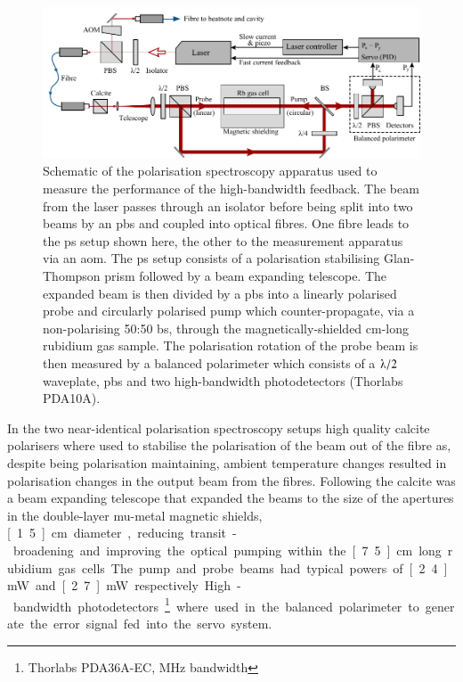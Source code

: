 \begin{figure}
\center
\includegraphics[width=\linewidth]{part1/Figs/ps_two_laser.pdf}
\caption[Apparatus used to test the efficacy of polarisation spectroscopy.]{Schematic of the polarisation spectroscopy apparatus used to measure the performance of the high-bandwidth feedback. The beam from the laser passes through an isolator before being split into two beams by an \gls{pbs} and coupled into optical fibres.
One fibre leads to the \gls{ps} setup shown here, the other to the measurement apparatus via an \gls{aom}.
The \gls{ps} setup consists of a polarisation stabilising Glan-Thompson prism followed by a beam expanding telescope.
The expanded beam is then divided by a \gls{pbs} into a linearly polarised probe and circularly polarised pump which counter-propagate, via a non-polarising 50:50 \gls{bs}, through the magnetically-shielded \unit[15]{cm}-long rubidium gas sample.
The polarisation rotation of the probe beam is then measured by a balanced polarimeter which consists of a $\lambdaup/2$ waveplate, \gls{pbs} and two high-bandwidth photodetectors (Thorlabs PDA10A).}
\label{figure:two_laser_setup}
\end{figure}

In the two near-identical polarisation spectroscopy setups high quality calcite polarisers where used to stabilise the polarisation of the beam out of the fibre as, despite being polarisation maintaining, ambient temperature changes resulted in polarisation changes in the output beam from the fibres.
Following the calcite was a beam expanding telescope that expanded the beams to the size of the apertures in the double-layer mu-metal magnetic shields, \unit[1.5]{cm} diameter, reducing transit-broadening and improving the optical pumping within the \unit[7.5]{cm} long rubidium gas cells.
The pump and probe beams had typical powers of \unit[2.4]{mW} and \unit[2.7]{mW} respectively.
High-bandwidth photodetectors\footnote{Thorlabs PDA36A-EC, \unit[150]{MHz} bandwidth} where used in the balanced polarimeter to generate the error signal fed into the servo system.

